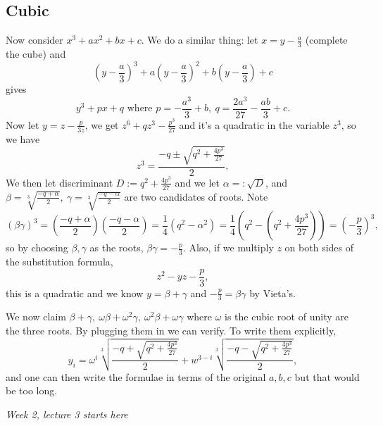 \documentclass[a4paper]{article}
\theoremstyle{definition}
\begin{document}
\subsection{Cubic}
\label{sec:cubic}
Now consider $x^3+ax^2+bx+c$. We do a similar thing: let $x=y-\frac{a}{3}$ (complete the cube) and
\[
\left(y-\frac{a}{3}\right)^3+a\left(y-\frac{a}{3}\right)^2+b\left(y-\frac{a}{3}\right)+c
\]
gives
\[
y^3+px+q\text{ where }p=-\frac{a^3}{3}+b,\ q=\frac{2a^3}{27}-\frac{ab}{3}+c.
\]
Now let $y=z-\frac{p}{3z}$, we get $z^6+qz^3-\frac{p^3}{27}$ and it's a quadratic in the variable $z^3$, so we have
\[
z^3=\frac{-q\pm \sqrt{q^2+\frac{4p^3}{27}}}{2},
\]
We then let discriminant $D:=q^2+\frac{4p^3}{27}$ and we let $\alpha=:\sqrt D$, and $\beta=\sqrt[3]{\frac{-q+\alpha}{2}},\ \gamma=\sqrt[3]{\frac{-q-\alpha}{2}}$ are two candidates of roots. Note
\[
(\beta\gamma)^3=\left(\frac{-q+\alpha}{2}\right)\left(\frac{-q-\alpha}{2}\right)=\frac14 (q^2-\alpha^2)=\frac14 \left(q^2-\left(q^2+\frac{4p^3}{27}\right)\right)=\left(-\frac{p}{3}\right)^3,
\]
so by choosing $\beta,\gamma$ as the roots, $\beta\gamma=-\frac{p}{3}$. Also, if we multiply $z$ on both sides of the substitution formula,
\[
z^2-yz-\frac{p}{3},
\]
this is a quadratic and we know $y=\beta+\gamma$ and $-\frac{p}{3}=\beta\gamma$ by Vieta's.

We now claim $\beta+\gamma,\ \omega\beta+\omega^2\gamma,\ \omega^2\beta+\omega\gamma$ where $\omega$ is the cubic root of unity are the three roots. By plugging them in we can verify. To write them explicitly,
\[
y_i=\omega^i \sqrt[3]{\frac{-q+\sqrt{q^2+\frac{4p^3}{27}}}{2}}+w^{3-i} \sqrt[3]{\frac{-q-\sqrt{q^2+\frac{4p^3}{27}}}{2}},
\]
and one can then write the formulae in terms of the original $a,b,c$ but that would be too long.

\begin{flushright}
\textit{Week 2, lecture 3 starts here}
\end{flushright}
\end{document}
